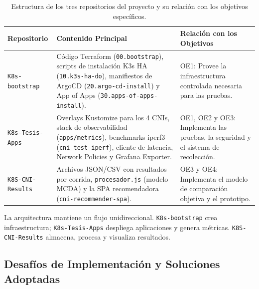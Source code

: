 \begin{table}[htbp]
\centering
\scriptsize
\renewcommand{\arraystretch}{1.25}
\setlength{\tabcolsep}{4pt}
\caption{Estructura de los tres repositorios del proyecto y su relación con los objetivos específicos.}
\label{tab:repositorios-entregables}
\begin{tabularx}{\textwidth}{|p{3cm}|Y|p{5.2cm}|}
\hline
\textbf{Repositorio} & \textbf{Contenido Principal} & \textbf{Relación con los Objetivos} \\
\hline
\texttt{K8s-bootstrap} & Código Terraform (\texttt{00.bootstrap}), scripts de instalación K3s HA (\texttt{10.k3s-ha-do}), manifiestos de ArgoCD (\texttt{20.argo-cd-install}) y App of Apps (\texttt{30.apps-of-apps-install}). & OE1: Provee la infraestructura controlada necesaria para las pruebas. \\
\hline
\texttt{K8s-Tesis-Apps} & Overlays Kustomize para los 4 CNIs, stack de observabilidad (\texttt{apps/metrics}), benchmarks iperf3 (\texttt{cni\_test\_iperf}), cliente de latencia, Network Policies y Grafana Exporter. & OE1, OE2 y OE3: Implementa las pruebas, la seguridad y el sistema de recolección. \\
\hline
\texttt{K8S-CNI-Results} & Archivos JSON/CSV con resultados por corrida, \texttt{procesador.js} (modelo MCDA) y la SPA recomendadora (\texttt{cni-recommender-spa}). & OE3 y OE4: Implementa el modelo de comparación objetiva y el prototipo. \\
\hline
\end{tabularx}
\end{table}

La arquitectura mantiene un flujo unidireccional. \texttt{K8s-bootstrap} crea infraestructura; \texttt{K8s-Tesis-Apps} despliega aplicaciones y genera métricas. \texttt{K8S-CNI-Results} almacena, procesa y visualiza resultados.

\subsection{Desafíos de Implementación y Soluciones Adoptadas}

